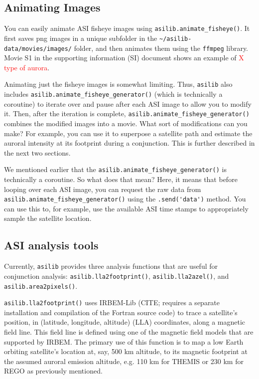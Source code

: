\documentclass[draft]{agujournal2019}
\begin{document}
\subsection{Animating Images}
You can easily animate ASI fisheye images using \verb|asilib.animate_fisheye()|. It first saves png images in a unique subfolder in the \verb|~/asilib-data/movies/images/| folder, and then animates them using the \verb|ffmpeg| library. Movie S1 in the supporting information (SI) document shows an example of \textcolor{red}{X type of aurora}.

Animating just the fisheye images is somewhat limiting. Thus, \verb|asilib| also includes \verb|asilib.animate_fisheye_generator()| (which is technically a coroutine) to iterate over and pause after each ASI image to allow you to modify it. Then, after the iteration is complete, \verb|asilib.animate_fisheye_generator()| combines the modified images into a movie. What sort of modifications can you make? For example, you can use it to superpose a satellite path and estimate the auroral intensity at its footprint during a conjunction. This is further described in the next two sections. 

We mentioned earlier that the \verb|asilib.animate_fisheye_generator()| is technically a coroutine. So what does that mean? Here, it means that before looping over each ASI image, you can request the raw data from \verb|asilib.animate_fisheye_generator()| using the \verb|.send('data')| method. You can use this to, for example, use the available ASI time stamps to appropriately sample the satellite location.

\subsection{ASI analysis tools}
Currently, \verb|asilib| provides three analysis functions that are useful for conjunction analysis: \verb|asilib.lla2footprint()|, \verb|asilib.lla2azel()|, and \verb|asilib.area2pixels()|.

\verb|asilib.lla2footprint()| uses IRBEM-Lib (CITE; requires a separate installation and compilation of the Fortran source code) to trace a satellite's position, in (latitude, longitude, altitude) (LLA) coordinates, along a magnetic field line. This field line is defined using one of the magnetic field models that are supported by IRBEM. The primary use of this function is to map a low Earth orbiting satellite's location at, say, 500 km altitude, to its magnetic footprint at the assumed auroral emission altitude, e.g. 110 km for THEMIS or 230 km for REGO as previously mentioned.
\end{document}
